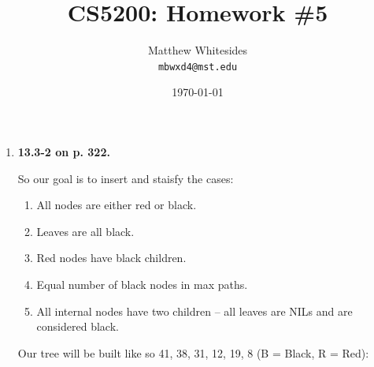\documentclass{article}
\title{CS5200: Homework \#5} %
\author{Matthew Whitesides\\ \texttt{mbwxd4@mst.edu}} %
\date{\today} %
\begin{document}
  \maketitle %
 
  \begin{enumerate}
    \item \textbf{13.3-2 on p. 322.}
    
    So our goal is to insert and staisfy the cases:

    \begin{enumerate}
      \item All nodes are either red or black.
      \item Leaves are all black.
      \item Red nodes have black children.
      \item Equal number of black nodes in max paths.
      \item All internal nodes have two children – all leaves are NILs and are considered black.
    \end{enumerate}

    Our tree will be built like so {41, 38, 31, 12, 19, 8} (B = Black, R = Red):


\end{enumerate}
\end{document}
